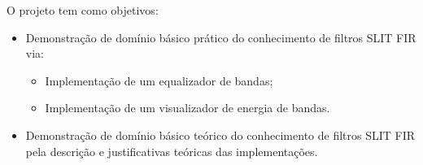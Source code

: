 O projeto tem como objetivos:

\begin{itemize}
    \item Demonstração de domínio básico prático do conhecimento de filtros SLIT FIR via:
    \begin{itemize}
        \item Implementação de um equalizador de bandas;
        \item Implementação de um visualizador de energia de bandas.
    \end{itemize}
    \item Demonstração de domínio básico teórico do conhecimento de filtros SLIT FIR pela descrição e justificativas teóricas das implementações.
\end{itemize}